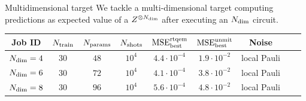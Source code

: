 \documentclass[8pt, xcolor={svgnames}, hyperref={linkcolor=black}]{beamer}
\begin{document}
\begin{frame}{Multidimensional target}
We tackle a multi-dimensional target computing predictions as expected value of 
a $Z^{\otimes N_{\rm \dim}}$ after executing an $N_{\rm \dim}$ circuit.

\begin{center}
\footnotesize
\begin{tabular}{ccccccccc}
\hline \hline 
\rule{0pt}{2.5ex}
\textbf{Job ID} & $N_{\rm train}$ & $N_{\rm params}$ & $N_{\rm shots}$ 
& $\text{MSE}_{\rm best}^{\rm rtqem}$ &  $\text{MSE}_{\rm best}^{\rm unmit}$ & Noise \\
\hline
$N_{\rm dim}=4$ & $30$ & $48$ & $10^{4}$ &  $4.4 \cdot 10^{-4}$ & $1.9 \cdot 10^{-2}$ & local Pauli \\
$N_{\rm dim}=6$ & $30$ & $72$ & $10^{4}$ &  $4.1 \cdot 10^{-4}$ & $3.8 \cdot 10^{-2}$ & local Pauli \\
$N_{\rm dim}=8$ & $30$ & $96$ & $10^{4}$ &  $5.6 \cdot 10^{-4}$ & $4.8 \cdot 10^{-2}$ & local Pauli \\
\hline \hline 
\end{tabular}
\end{center}


\end{frame}
\end{document}

